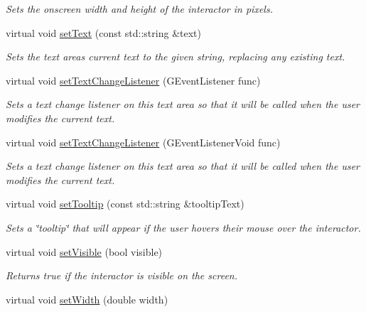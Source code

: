 \begin{DoxyCompactItemize}
\begin{DoxyCompactList}\small\item\em Sets the onscreen width and height of the interactor in pixels. \end{DoxyCompactList}\item 
virtual void \mbox{\hyperlink{classGTextArea_ac1ae51949d41ee9054634be5967d91b8}{set\+Text}} (const std\+::string \&text)
\begin{DoxyCompactList}\small\item\em Sets the text area\textquotesingle{}s current text to the given string, replacing any existing text. \end{DoxyCompactList}\item 
virtual void \mbox{\hyperlink{classGTextArea_ae41284f9c540110180ac0ad6beca5cb0}{set\+Text\+Change\+Listener}} (G\+Event\+Listener func)
\begin{DoxyCompactList}\small\item\em Sets a text change listener on this text area so that it will be called when the user modifies the current text. \end{DoxyCompactList}\item 
virtual void \mbox{\hyperlink{classGTextArea_ae8df75b0746951146d29220f386fcd33}{set\+Text\+Change\+Listener}} (G\+Event\+Listener\+Void func)
\begin{DoxyCompactList}\small\item\em Sets a text change listener on this text area so that it will be called when the user modifies the current text. \end{DoxyCompactList}\item 
virtual void \mbox{\hyperlink{classGInteractor_a039e0e49beaecc275efce02d416acea8}{set\+Tooltip}} (const std\+::string \&tooltip\+Text)
\begin{DoxyCompactList}\small\item\em Sets a \char`\"{}tooltip\char`\"{} that will appear if the user hovers their mouse over the interactor. \end{DoxyCompactList}\item 
virtual void \mbox{\hyperlink{classGInteractor_a18e44e30b31525a243960ca3928125aa}{set\+Visible}} (bool visible)
\begin{DoxyCompactList}\small\item\em Returns true if the interactor is visible on the screen. \end{DoxyCompactList}\item 
virtual void \mbox{\hyperlink{classGInteractor_aa3f3fba4cb131baa8696ba01e3bceca1}{set\+Width}} (double width)

\end{DoxyCompactItemize}
